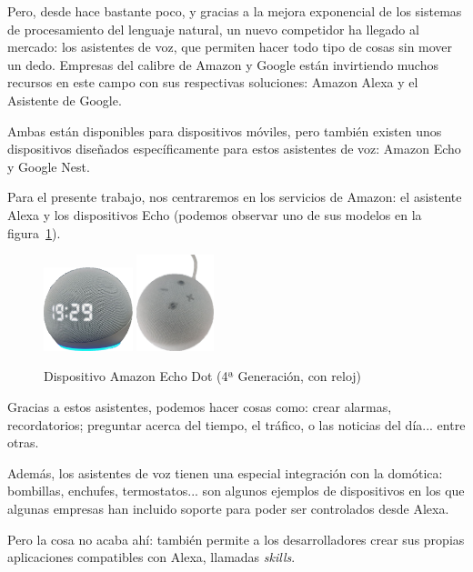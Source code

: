 \documentclass[11pt,spanish,listoffigures,listoftables,table,hyphens,dvipsnames]{tfgetsinf}
\begin{document}
Pero, desde hace bastante poco, y gracias a la mejora exponencial de los sistemas de procesamiento del lenguaje natural, un nuevo competidor ha llegado al mercado: los asistentes de voz, que permiten hacer todo tipo de cosas sin mover un dedo. Empresas del calibre de Amazon y Google están invirtiendo muchos recursos en este campo con sus respectivas soluciones: Amazon Alexa y el Asistente de Google.

Ambas están disponibles para dispositivos móviles, pero también existen unos dispositivos diseñados específicamente para estos asistentes de voz: Amazon Echo y Google Nest.

Para el presente trabajo, nos centraremos en los servicios de Amazon: el asistente Alexa y los dispositivos Echo (podemos observar uno de sus modelos en la figura~\ref{figura:echo-dot}).

\begin{figure}[ht]
   \centering
   \includegraphics[width=0.23\textwidth]{echo-dot.png}
   \includegraphics[width=0.20\textwidth]{echo-dot-2.png}
      \caption{Dispositivo Amazon Echo Dot (4ª Generación, con reloj)}
   \label{figura:echo-dot}
\end{figure}

Gracias a estos asistentes, podemos hacer cosas como: crear alarmas, recordatorios; preguntar acerca del tiempo, el tráfico, o las noticias del día... entre otras.

Además, los asistentes de voz tienen una especial integración con la domótica: bombillas, enchufes, termostatos... son algunos ejemplos de dispositivos en los que algunas empresas han incluido soporte para poder ser controlados desde Alexa.

Pero la cosa no acaba ahí: también permite a los desarrolladores crear sus propias aplicaciones compatibles con Alexa, llamadas \emph{skills}.
\end{document}
